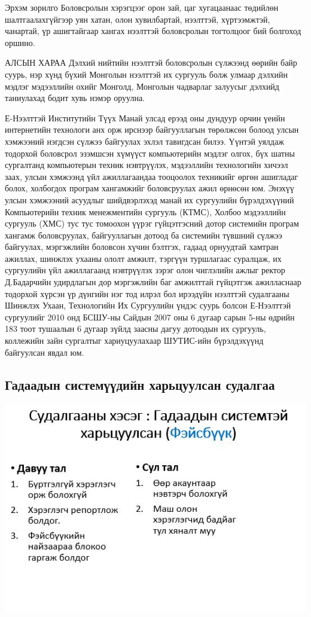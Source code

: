 \documentclass[
oneside, %
english, %
onehalfspacing, %
nolistspacing, %
headsepline, %
]{article} %
\begin{document}
    Эрхэм зорилго
        Боловсролын хэрэгцээг орон зай, цаг хугацаанаас төдийлөн шалтгаалахгүйгээр уян хатан, олон хувилбартай, нээлттэй, хүртээмжтэй, чанартай, үр ашигтайгаар хангах нээлттэй боловсролын тогтолцоог бий болгоход оршино.
        
    АЛСЫН ХАРАА
        Дэлхий нийтийн нээлттэй боловсролын сүлжээнд өөрийн байр суурь, нэр хүнд бүхий Монголын нээлттэй их сургууль болж улмаар дэлхийн мэдлэг мэдээллийн охийг Монголд, Монголын чадварлаг залуусыг дэлхийд таниулахад бодит хувь нэмэр оруулна.
        
    
    Е-Нээлттэй Институтийн Түүх
       Манай улсад ерээд оны дундуур орчин үеийн интернетийн технологи анх орж ирснээр байгууллагын төрөлжсөн болоод улсын хэмжээний нэгдсэн сүлжээ байгуулах эхлэл тавигдсан билээ. Үүнтэй уялдаж тодорхой боловсрол эзэмшсэн хүмүүст компьютерийн мэдлэг олгох, бүх шатны сургалтанд компьютерын техник нэвтрүүлэх, мэдээллийн технологийн хичээл заах, улсын хэмжээнд үйл ажиллагаандаа тооцоолох техникийг өргөн ашигладаг болох, холбогдох програм хангамжийг боловсруулах ажил өрнөсөн юм. Энэхүү улсын хэмжээний асуудлыг шийдвэрлэхэд манай их сургуулийн бүрэлдэхүүний Компьютерийн техник менежментийн сургууль (КТМС), Холбоо мэдээллийн сургууль (ХМС) тус тус томоохон үүрэг гүйцэтгэсний дотор системийн програм хангамж боловсруулах, байгууллагын дотоод ба системийн түвшний сүлжээ байгуулах, мэргэжлийн боловсон хүчин бэлтгэх, гадаад орнуудтай хамтран ажиллах, шинжлэх ухааны ололт амжилт, тэргүүн туршлагаас суралцаж, их сургуулийн үйл ажиллагаанд нэвтрүүлэх зэрэг олон чиглэлийн ажлыг ректор Д.Бадарчийн удирдлагын дор мэргэжлийн баг амжилттай гүйцэтгэж ажилласнаар тодорхой хүрсэн үр дүнгийн нэг тод илрэл бол ирээдүйн нээлттэй судалгааны Шинжлэх Ухаан, Технологийн Их Сургуулийн үндэс суурь болсон Е-Нээлттэй сургуулийг 2010 онд БСШУ-ны Сайдын 2007 оны 6 дугаар сарын 5-ны өдрийн 183 тоот тушаалын 6 дугаар зүйлд заасны дагуу дотоодын их сургууль, коллежийн зайн сургалтыг хариуцуулахаар ШУТИС-ийн бүрэлдэхүүнд байгуулсан явдал юм.
	\subsection{Гадаадын системүүдийн харьцуулсан судалгаа}
	
	\includegraphics[width=\textwidth]{gadaadsudalgaa}
\end{document}
